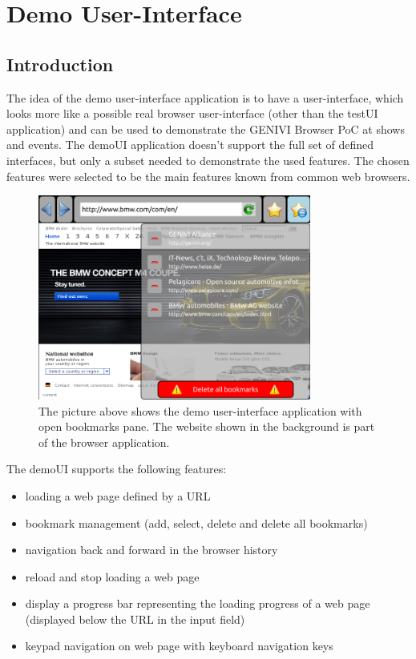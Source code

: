 \documentclass{pelagicore}
\begin{document}
\section{Demo User-Interface}
\subsection {Introduction}
The idea of the demo user-interface application is to have a user-interface,
which looks more like a possible real browser user-interface (other than the
testUI application) and can be used to demonstrate the GENIVI Browser PoC at
shows and events. The demoUI application doesn’t support the full set of
defined interfaces, but only a subset needed to demonstrate the used features.
The chosen features were selected to be the main features known from common web
browsers.

\begin{figure}[!ht]
    \center
    \includegraphics[width=0.8\textwidth]{demoui.png}
    \caption{The picture above shows the demo user-interface application with
             open bookmarks pane. The website shown in the background is part
             of the browser application.}
\end{figure}

The demoUI supports the following features:
\begin{itemize}
    \item loading a web page defined by a URL
    \item bookmark management (add, select, delete and delete all bookmarks)
    \item navigation back and forward in the browser history
    \item reload and stop loading a web page
    \item display a progress bar representing the loading progress of a web page
          (displayed below the URL in the input field)
    \item keypad navigation on web page with keyboard navigation keys
\end{itemize}
\end{document}
